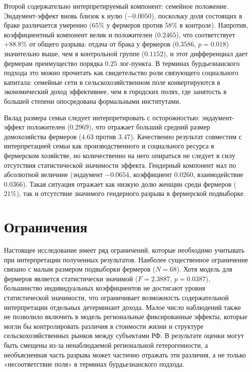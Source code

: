 \documentclass[14pt, a4paper]{article}
\begin{document}
	Второй содержательно интерпретируемый компонент: семейное положение. Эндаумент-эффект вновь близок к нулю (\(-0.0050\)), поскольку доля состоящих в браке различается умеренно (\(65\%\) у фермеров против \(58\%\) в контроле). Напротив, коэффициентный компонент велик и положителен (\(0.2465\)), что соответствует \(+88.8\%\) от общего разрыва: отдача от брака у фермеров (\(0.3586\), \(p=0.018\)) значительно выше, чем в контрольной группе (\(0.1152\)), и этот дифференциал дает фермерам преимущество порядка \(0.25\) лог-пункта. В терминах бурдьезианского подхода это можно прочитать как свидетельство роли связующего социального капитала: семейные сети в сельскохозяйственном поле конвертируются в экономический доход эффективнее, чем в городских полях, где занятость в большей степени опосредована формальными институтами.
	
	Вклад размера семьи следует интерпретировать с осторожностью: эндаумент-эффект положителен (\(0.2969\)), что отражает больший средний размер домохозяйства фермеров (\(4.63\) против \(3.47\)). Качественно результат совместим с интерпретацией семьи как производственного и социального ресурса в фермерском хозяйстве, но количественно на него опираться не следует в силу отсутствия статистической значимости эффекта. Гендерный компонент мал по абсолютной величине (эндаумент \(-0.0654\), коэффициент \(0.0260\), взаимодействие \(0.0366\)). Такая ситуация отражает как низкую долю женщин среди фермеров (\(21\%\)), так и отсутствие значимого гендерного разрыва в фермерской подвыборке.
	
	\section{Ограничения}\label{sec:discussion}
	Настоящее исследование имеет ряд ограничений, которые необходимо учитывать при интерпретации полученных результатов. Наиболее существенное ограничение связано с малым размером подвыборки фермеров ($N = 68$). Хотя модель для фермеров является статистически значимой ($F = 2.3887$, $p = 0.0387$), большинство индивидуальных коэффициентов не достигают уровня статистической значимости, что ограничивает возможность содержательной интерпретации отдельных детерминант дохода. Малое число наблюдений также не позволило включить в модель региональные фиксированные эффекты, которые могли бы контролировать различия в стоимости жизни и структуре сельскохозяйственных рынков между субъектами РФ. В результате оценки могут быть смещены из-за ненаблюдаемой региональной гетерогенности, а необъясненная часть разрыва может частично отражать эти различия, а не только «несоответствие поля» в терминах бурдьезианского подхода.
	
\end{document}
